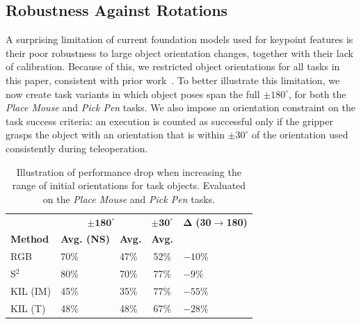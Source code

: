 \documentclass[letterpaper, 10 pt, conference]{ieeeconf}  %
\begin{document}
\subsection{Robustness Against Rotations}
\label{sec:experiments-orientation}


A surprising limitation of current foundation models used for keypoint features is their poor robustness to large object orientation changes, together with their lack of calibration. Because of this, we restricted object orientations for all tasks in this paper, consistent with prior work~\cite{Levy2025P3PO,di2024KAT,wang2025skil}. To better illustrate this limitation, we now create task variants in which object poses span the full \(\pm 180^\circ\), for both the \textit{Place Mouse} and \textit{Pick Pen} tasks. We also impose an orientation constraint on the task success criteria: an execution is counted as successful only if the gripper grasps the object with an orientation that is within \(\pm 30^\circ\) of the orientation used consistently during teleoperation. 
\begin{table}
    \centering
    \renewcommand{\arraystretch}{1.2}
    \setlength{\tabcolsep}{5pt} %
    \caption{Illustration of performance drop when increasing the range of initial orientations for task objects. Evaluated on the \textit{Place Mouse} and \textit{Pick Pen} tasks.}
    \begin{tabularx}{0.95 \linewidth}{l Y Y c Y}
        \toprule
        &  & \(\boldsymbol{\pm 30^\circ}\) & \(\boldsymbol{\Delta}\) \textbf{(30$\to$180)} \\
        \cmidrule(lr){2-3} \cmidrule(lr){4-4}
        \textbf{Method} & \textbf{Avg. (NS)} & \textbf{Avg.} & \textbf{Avg.} & \\
        \midrule
        RGB      & 70\% & 47\% & 52\% & $-10\%$ \\
        S$^2$    & 80\% & 70\% & 77\% & $-9\%$ \\
        KIL (IM) & 45\% & 35\% & 77\% & $-55\%$ \\
        KIL (T)  & 48\% & 48\% & 67\% & $-28\%$ \\
        \bottomrule
    \end{tabularx}
\label{tab:more-rotations-experiment}
\vspace{-0.0cm}%
    \vspace{-\baselineskip}
\end{table}
\end{document}
